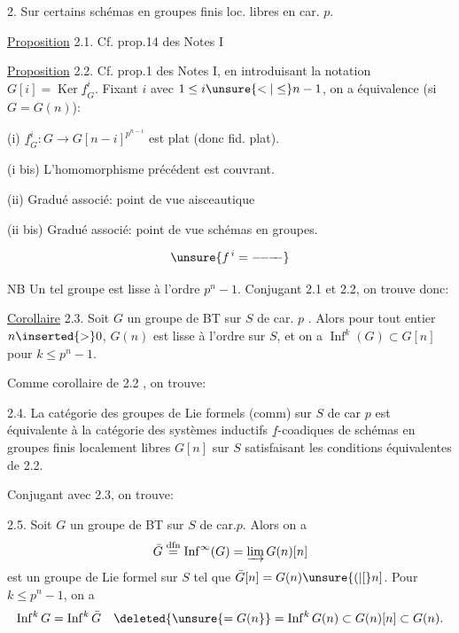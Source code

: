 2. Sur certains schémas en groupes finis loc. libres en car. $p$.

\uline{Proposition} 2.1. Cf. prop.14 des Notes I

\uline{Proposition} 2.2. Cf. prop.1 des Notes I, en introduisant la notation
$G[i]=\operatorname{Ker}\underline f_G^i$. Fixant $i$ avec
$1\leq i\unsure{<|\leq}n-1$, on a équivalence (si $G=G(n)$):

(i) $\underline f_G^i:G\longrightarrow G[n-i]^{p^{n-i}}$ est plat (donc fid. plat).

(i bis) L'homomorphisme précédent est couvrant.


(ii) Gradué associé: point de vue aisceautique

(ii bis) Gradué associé: point de vue schémas en groupes.

\[\unsure{f^{\,i}=-\!\!-\!\!-\!\!-}\]

NB Un tel groupe est lisse à l'ordre $p^n-1$. Conjugant 2.1 et 2.2, on trouve donc:

\uline{Corollaire} 2.3. Soit $G$ un groupe de BT sur $S$ de car. $p$ .
Alors pour 
tout entier $n\inserted{>}0$, $G(n)$ est lisse à l'ordre  sur $S$, et on a
$\operatorname{Inf}^k(G)\subset G[n]$ pour $k\leq p^n-1$.

Comme corollaire de 2.2 , on trouve:

 2.4. La catégorie des groupes de Lie formels (comm) sur $S$ de car $p$ est équivalente à la catégorie des systèmes inductifs $\underline f$-coadiques de schémas en groupes finis localement libres $G[n]$ sur $S$ satisfaisant les conditions équivalentes de 2.2.

Conjugant avec 2.3, on trouve:

 2.5. Soit $G$ un groupe de BT sur $S$ de car.$p$. Alors on a
\[
\bar G\overset{\mathrm{dfn}}=\operatorname{Inf}^{\infty}(G)=\varinjlim G(n)[n]
\]
est un groupe de Lie formel sur $S$ tel que $\bar G[n]=G(n)\unsure{(|[}n]$. Pour $k\leq p^n-1$, on a
\[
\operatorname{Inf}^kG=\operatorname{Inf}^k\bar G\quad\deleted{\unsure{=G(n}}=\operatorname{Inf}^kG(n)\subset G(n)[n]\subset G(n).
\]

